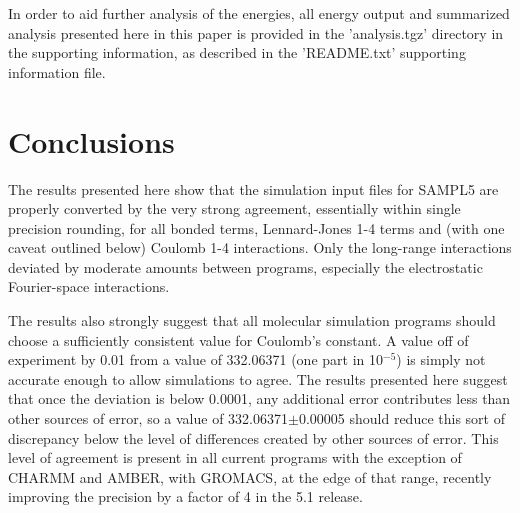In order to aid further analysis of the energies, all energy output
and summarized analysis presented here in this paper is provided in
the 'analysis.tgz' directory in the supporting information, as
described in the 'README.txt' supporting information file.


\section*{Conclusions}
The results presented here show that the simulation input files for
SAMPL5 are properly converted by the very strong agreement,
essentially within single precision rounding, for all bonded terms,
Lennard-Jones 1-4 terms and (with one caveat outlined below) Coulomb
1-4 interactions. Only the long-range interactions deviated by
moderate amounts between programs, especially the electrostatic
Fourier-space interactions.  

The results also strongly suggest that all molecular simulation
programs should choose a sufficiently consistent value for Coulomb's
constant. A value off of experiment by 0.01 from a value of 332.06371
(one part in 10$^{-5}$) is simply not accurate enough to allow
simulations to agree.  The results presented here suggest that once
the deviation is below 0.0001, any additional error contributes less
than other sources of error, so a value of 332.06371$\pm$0.00005
should reduce this sort of discrepancy below the level of differences
created by other sources of error.  This level of agreement is present
in all current programs with the exception of CHARMM and AMBER, with
GROMACS, at the edge of that range, recently improving the precision
by a factor of 4 in the 5.1 release.

